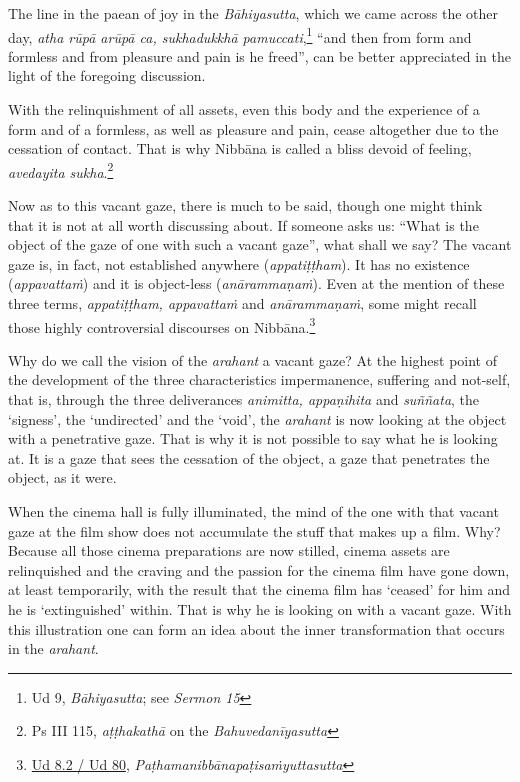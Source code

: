 The line in the paean of joy in the \emph{Bāhiyasutta}, which we came across the other day, \emph{atha rūpā arūpā ca, sukhadukkhā pamuccati},\footnote{Ud 9, \emph{Bāhiyasutta}; see \emph{Sermon 15}} ``and then from form and formless and from pleasure and pain is he freed'', can be better appreciated in the light of the foregoing discussion.

With the relinquishment of all assets, even this body and the experience of a form and of a formless, as well as pleasure and pain, cease altogether due to the cessation of contact. That is why Nibbāna is called a bliss devoid of feeling, \emph{avedayita sukha}.\footnote{Ps III 115, \emph{aṭṭhakathā} on the \emph{Bahuvedanīyasutta}}

Now as to this vacant gaze, there is much to be said, though one might think that it is not at all worth discussing about. If someone asks us: ``What is the object of the gaze of one with such a vacant gaze'', what shall we say? The vacant gaze is, in fact, not established anywhere (\emph{appatiṭṭham}). It has no existence (\emph{appavattaṁ}) and it is object-less (\emph{anārammaṇaṁ}). Even at the mention of these three terms, \emph{appatiṭṭham, appavattaṁ} and \emph{anārammaṇaṁ}, some might recall those highly controversial discourses on Nibbāna.\footnote{\href{https://suttacentral.net/ud8.2/pli/ms}{Ud 8.2 / Ud 80}, \emph{Paṭhamanibbānapaṭisaṁyuttasutta}}

Why do we call the vision of the \emph{arahant} a vacant gaze? At the highest point of the development of the three characteristics impermanence, suffering and not-self, that is, through the three deliverances \emph{animitta, appaṇihita} and \emph{suññata}, the `signess', the `undirected' and the `void', the \emph{arahant} is now looking at the object with a penetrative gaze. That is why it is not possible to say what he is looking at. It is a gaze that sees the cessation of the object, a gaze that penetrates the object, as it were.

When the cinema hall is fully illuminated, the mind of the one with that vacant gaze at the film show does not accumulate the stuff that makes up a film. Why? Because all those cinema preparations are now stilled, cinema assets are relinquished and the craving and the passion for the cinema film have gone down, at least temporarily, with the result that the cinema film has `ceased' for him and he is `extinguished' within. That is why he is looking on with a vacant gaze. With this illustration one can form an idea about the inner transformation that occurs in the \emph{arahant}.


